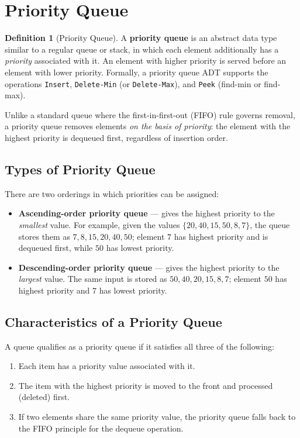 \documentclass[11pt, a4paper, notitlepage]{report}
\theoremstyle{definition}
\newtheorem{definition}[theorem]{Definition}
\theoremstyle{remark}
\theoremstyle{definition}
\begin{document}
\section{Priority Queue}
\label{sec:priority-queue}

\begin{definition}[Priority Queue]
\label{def:priority-queue}
A \textbf{priority queue} is an abstract data type similar to a regular queue or stack, in
which each element additionally has a \emph{priority} associated with it.  An element with
higher priority is served before an element with lower priority.  Formally, a priority queue
ADT supports the operations \texttt{Insert}, \texttt{Delete-Min} (or \texttt{Delete-Max}),
and \texttt{Peek} (find-min or find-max).
\end{definition}

Unlike a standard queue where the first-in-first-out (FIFO) rule governs removal, a priority
queue removes elements \emph{on the basis of priority}: the element with the highest priority
is dequeued first, regardless of insertion order.

\subsection{Types of Priority Queue}
\label{subsec:pq-types}

There are two orderings in which priorities can be assigned:

\begin{itemize}
  \item \textbf{Ascending-order priority queue} --- gives the highest priority to the
        \emph{smallest} value.  For example, given the values $\{20, 40, 15, 50, 8, 7\}$,
        the queue stores them as $7, 8, 15, 20, 40, 50$; element $7$ has highest priority
        and is dequeued first, while $50$ has lowest priority.
  \item \textbf{Descending-order priority queue} --- gives the highest priority to the
        \emph{largest} value.  The same input is stored as $50, 40, 20, 15, 8, 7$; element
        $50$ has highest priority and $7$ has lowest priority.
\end{itemize}

\subsection{Characteristics of a Priority Queue}
\label{subsec:pq-characteristics}

A queue qualifies as a priority queue if it satisfies all three of the following:
\begin{enumerate}
  \item Each item has a priority value associated with it.
  \item The item with the highest priority is moved to the front and processed (deleted) first.
  \item If two elements share the same priority value, the priority queue falls back to the
        FIFO principle for the dequeue operation.
\end{enumerate}
\end{document}
